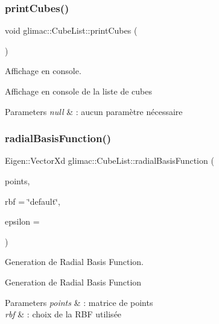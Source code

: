 \subsubsection{\texorpdfstring{print\+Cubes()}{printCubes()}}
{\footnotesize\ttfamily void glimac\+::\+Cube\+List\+::print\+Cubes (\begin{DoxyParamCaption}{ }\end{DoxyParamCaption})}



Affichage en console. 

Affichage en console de la liste de cubes


\begin{DoxyParams}{Parameters}
{\em null} & \+: aucun paramètre nécessaire \\
\hline
\end{DoxyParams}
\mbox{\label{classglimac_1_1CubeList_a538bbaae516f90563e233ef4b183c772}} 
\subsubsection{\texorpdfstring{radial\+Basis\+Function()}{radialBasisFunction()}}
{\footnotesize\ttfamily Eigen\+::\+Vector\+Xd glimac\+::\+Cube\+List\+::radial\+Basis\+Function (\begin{DoxyParamCaption}\item[{Eigen\+::\+Matrix\+Xd}]{points,  }\item[{std\+::string}]{rbf = {\ttfamily \char`\"{}default\char`\"{}},  }\item[{float}]{epsilon = {} }\end{DoxyParamCaption})}



Generation de Radial Basis Function. 

Generation de Radial Basis Function


\begin{DoxyParams}{Parameters}
{\em points} & \+: matrice de points \\
\hline
{\em rbf} & \+: choix de la R\+BF utilisée \\
\hline
\end{DoxyParams}
\mbox{\label{classglimac_1_1CubeList_a59d87cac2e218d617940ccdab5235b31}} 
